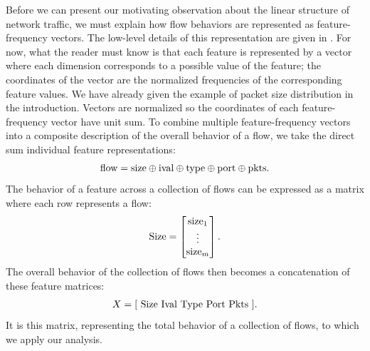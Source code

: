 \documentclass{acm_proc_article-sp}
\begin{document}
Before we can present our motivating observation about the linear structure of network traffic, we must explain how flow behaviors are represented as feature-frequency vectors. The low-level details of this representation are given in .
For now, what the reader must know is that each feature is represented by a vector where each dimension corresponds to a possible value of the feature;
the coordinates of the vector are the normalized frequencies of the corresponding feature values.
We have already given the example of packet size distribution in the introduction.
Vectors are normalized so the coordinates of each feature-frequency vector have unit sum.
To combine multiple feature-frequency vectors into a composite description of the overall behavior of a flow, we take the direct sum individual feature representations:\directsumnote
\begin{align}\eqn{flow}
  \text{flow} =
  \text{size} \directsum
  \text{ival} \directsum
  \text{type} \directsum
  \text{port} \directsum
  \text{pkts}.
\end{align}
The behavior of a feature across a collection of flows can be expressed as a matrix where each row represents a flow:
\begin{align}\eqn{Size}
  \text{Size} = \begin{bmatrix}
    \text{size}_1 \\
    \vdots \\
    \text{size}_m
  \end{bmatrix}.
\end{align}
The overall behavior of the collection of flows then becomes a concatenation of these feature matrices:
\begin{align}\eqn{X}
  X = \bracket{ ~
    \text{Size} ~
    \text{Ival} ~
    \text{Type} ~
    \text{Port} ~
    \text{Pkts} ~
  }.
\end{align}
It is this matrix, representing the total behavior of a collection of flows, to which we apply our analysis.


\end{document}
